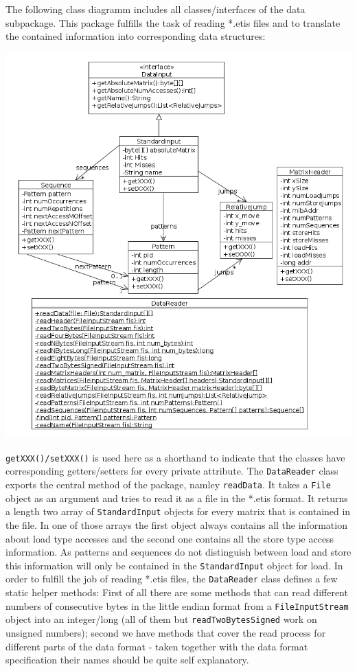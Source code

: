 The following class diagramm includes all classes/interfaces of the
data subpackage. This package fulfills the task of reading {*}.etis
files and to translate the contained information into corresponding
data structures:

\includegraphics[scale=0.55]{gui/DataClassDiagram.png}

\texttt{getXXX()/setXXX()} is used here as a shorthand to indicate
that the classes have corresponding getters/setters for every private
attribute. The \texttt{DataReader} class exports the central method
of the package, namley \texttt{readData}. It takes a \texttt{File}
object as an argument and tries to read it as a file in the {*}.etis
format. It returns a length two array of \texttt{StandardInput} objects
for every matrix that is contained in the file. In one of those arrays
the first object always contains all the information about load type
accesses and the second one contains all the store type access information.
As patterns and sequences do not distinguish between load and store
this information will only be contained in the \texttt{StandardInput}
object for load. In order to fulfill the job of reading {*}.etis files,
the \texttt{DataReader} class defines a few static helper methods:
First of all there are some methods that can read different numbers
of consecutive bytes in the little endian format from a \texttt{FileInputStream}
object into an integer/long (all of them but \texttt{readTwoBytesSigned}
work on unsigned numbers); second we have methods that cover the read
process for different parts of the data format - taken together with
the data format specification their names should be quite self explanatory.

